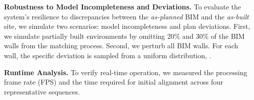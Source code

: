 

\textbf{Robustness to Model Incompleteness and Deviations.}
To evaluate the system's resilience to discrepancies between the \textit{as-planned} BIM and the \textit{as-built} site, we simulate two scenarios: model incompleteness and plan deviations. First, we simulate partially built environments by omitting 20\% and 30\% of the BIM walls from the matching process. Second, we perturb all BIM walls. For each wall, the specific deviation is sampled from a uniform distribution, . 

\textbf{Runtime Analysis.}
To verify real-time operation, we measured the processing frame rate (FPS) and the time required for initial alignment across four representative sequences.


